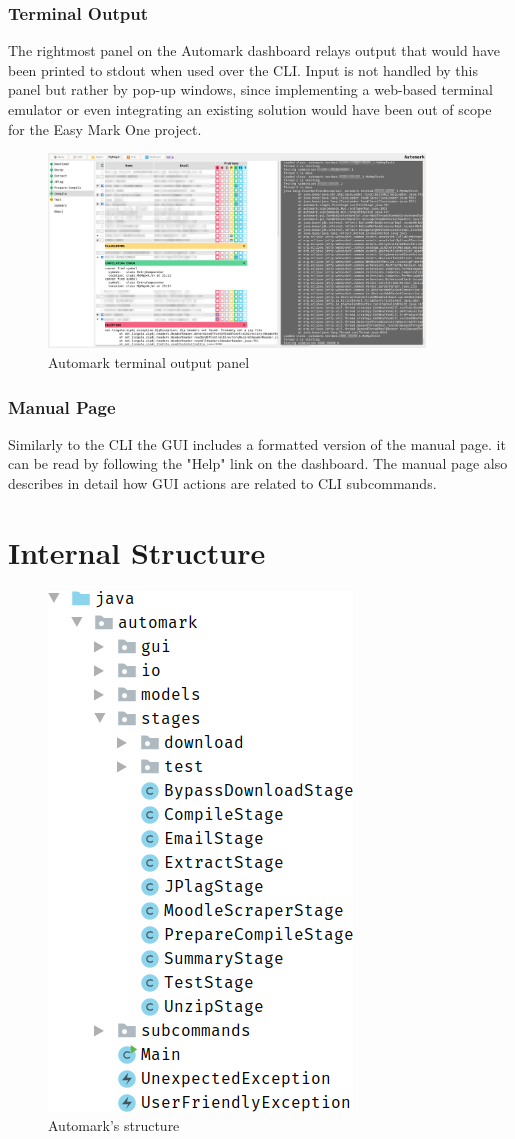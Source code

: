 \documentclass[12pt,a4paper,oneside]{report}
\begin{document}
	\subsubsection{Terminal Output}
	The rightmost panel on the Automark dashboard relays output that would have been printed to stdout when used over the CLI. Input is not handled by this panel but rather by pop-up windows, since implementing a web-based terminal emulator or even integrating an existing solution would have been out of scope for the Easy Mark One project.

	\begin{figure}[h]
		\centering
		\includegraphics[width=10cm,trim=56cm 20cm 0 2cm,clip]{automark_dashboard_w_details_expanded.png}
		\caption{Automark terminal output panel}
	\end{figure}

	\subsubsection{Manual Page}
	Similarly to the CLI the GUI includes a formatted version of the manual page. it can be read by following the "Help" link on the dashboard. The manual page also describes in detail how GUI actions are related to CLI subcommands.

	\section{Internal Structure}

	\begin{figure}
		\vskip-20pt
		\includegraphics[width=.312\textwidth]{automark_code_structure.png}
		\caption{Automark's structure}
	\end{figure}
\end{document}
